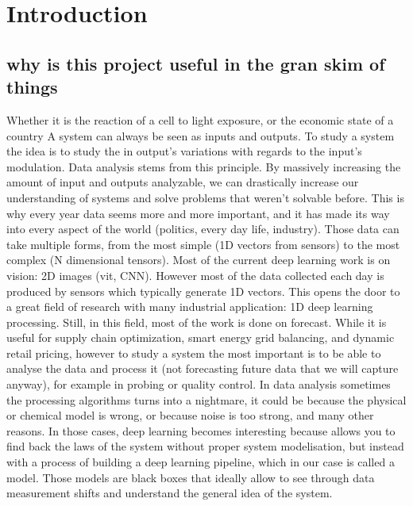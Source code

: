 \documentclass{article}
\begin{document}


\tableofcontents

\newpage

\begin{abstract}
In this context we decided to study this using the following method that yields the following result.
\end{abstract}

\section{Introduction}

\subsection{why is this project useful in the gran skim of things}
Whether it is the reaction of a cell to light exposure, or the economic state of a country A system can always be seen as inputs and outputs. To study a system the idea is to study the in output's variations with regards to the input's modulation. Data analysis stems from this principle. By massively increasing the amount of input and outputs analyzable, we can drastically increase our understanding of systems and solve problems that weren't solvable before. This is why every year data seems more and more important, and it has made its way into every aspect of the world (politics, every day life, industry). Those data can take multiple forms, from the most simple (1D vectors from sensors) to the most complex (N dimensional tensors). Most of the current deep learning work is on vision: 2D images (vit, CNN). However most of the data collected each day is produced by sensors which typically generate 1D vectors. This opens the door to a great field of research with many industrial application: 1D deep learning processing. Still, in this field, most of the work is done on forecast. While it is useful for supply chain optimization, smart energy grid balancing, and dynamic retail pricing, however to study a system the most important is to be able to analyse the data and process it (not forecasting future data that we will capture anyway), for example in probing or quality control. In data analysis sometimes the processing algorithms turns into a nightmare, it could be because the physical or chemical model is wrong, or because noise is too strong, and many other reasons. In those cases, deep learning becomes interesting because allows you to find back the laws of the system without proper system modelisation, but instead with a process of building a deep learning pipeline, which in our case is called a model. Those models are black boxes that ideally allow to see through data measurement shifts and understand the general idea of the system.
\end{document}
